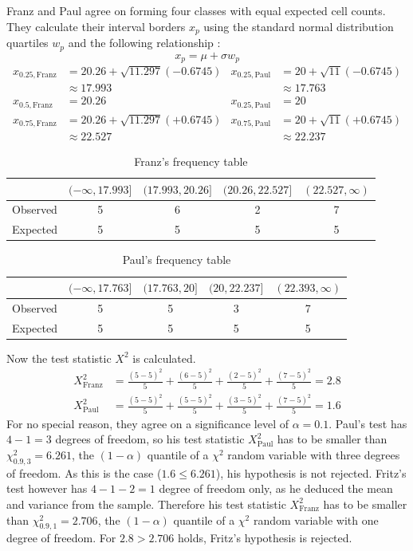 \documentclass{article}
\begin{document}
Franz and Paul agree on forming four classes with equal expected cell counts.
They calculate their interval borders $x_p$ using the standard normal distribution quartiles $w_p$ and the following relationship \cite{conover1980practical}:
\begin{equation*}
	x_p = \mu + \sigma w_p
\end{equation*}
%
\begin{align*}
	x_{0.25, \text{Franz}} &= 20.26 + \sqrt{11.297}(-0.6745) & x_{0.25, \text{Paul}} &= 20 + \sqrt{11}(-0.6745) \\
	&\approx 17.993 & &\approx 17.763 \\[1ex]
	x_{0.5, \text{Franz}} &= 20.26 & x_{0.25, \text{Paul}} &= 20 \\[1ex]
	x_{0.75, \text{Franz}} &= 20.26 + \sqrt{11.297}(+0.6745) & x_{0.75, \text{Paul}} &= 20 + \sqrt{11}(+0.6745) \\
	&\approx 22.527 & &\approx 22.237
\end{align*}
%
\begin{table}[h]
\center
\caption{Franz's frequency table}
\begin{tabular}{l|cccc}
	& $(-\infty, 17.993]$ & $(17.993, 20.26]$ & $(20.26, 22.527]$ & $(22.527,\infty)$ \\
	\hline
	Observed & 5 & 6 & 2 & 7 \\
	Expected & 5 & 5 & 5 & 5 \\
\end{tabular}
\end{table}
\begin{table}[h]
\center
\caption{Paul's frequency table}
\begin{tabular}{l|cccc}
	& $(-\infty, 17.763]$ & $(17.763, 20]$ & $(20, 22.237]$ & $(22.393,\infty)$ \\
	\hline
	Observed & 5 & 5 & 3 & 7 \\
	Expected & 5 & 5 & 5 & 5 \\
\end{tabular}
\end{table}
Now the test statistic $X^2$ is calculated.
\begin{align*}
	X^2_{\text{Franz}} &= \frac{(5-5)^2}{5} + \frac{(6-5)^2}{5} + \frac{(2-5)^2}{5} + \frac{(7-5)^2}{5} = 2.8
	\\[1ex]
	X^2_{\text{Paul}} &= \frac{(5-5)^2}{5} + \frac{(5-5)^2}{5} + \frac{(3-5)^2}{5} + \frac{(7-5)^2}{5} = 1.6
\end{align*}
%
For no special reason, they agree on a significance level of $\alpha = 0.1$.
Paul's test has $4-1=3$ degrees of freedom, so his test statistic $X^2_{\text{Paul}}$ has to be smaller than $\chi^2_{0.9, 3} = 6.261$, the $(1-\alpha)$ quantile of a $\chi^2$ random variable with three degrees of freedom.
As this is the case ($1.6 \leq 6.261$), his hypothesis is not rejected.
Fritz's test however has $4-1-2=1$ degree of freedom only, as he deduced the mean and variance from the sample.
Therefore his test statistic $X^2_{\text{Franz}}$ has to be smaller than $\chi^2_{0.9, 1} = 2.706$, the $(1-\alpha)$ quantile of a $\chi^2$ random variable with one degree of freedom.
For $2.8 > 2.706$ holds, Fritz's hypothesis is rejected.
\end{document}
